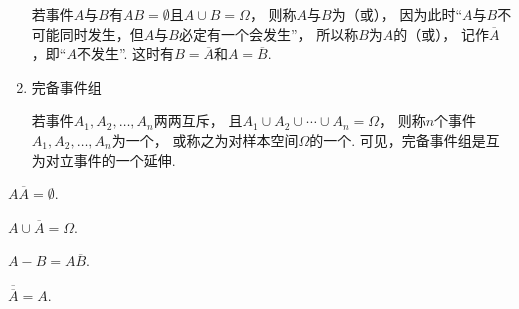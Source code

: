 \begin{definition}
\begin{enumerate}
	若事件\(A\)与\(B\)有\(AB = \emptyset\)且\(A \cup B = \Omega\)，
	则称\(A\)与\(B\)为（或），
	因为此时“\(A\)与\(B\)不可能同时发生，但\(A\)与\(B\)必定有一个会发生”，
	所以称\(B\)为\(A\)的（或），
	记作\(\overline{A}\)，即“\(A\)不发生”.
	这时有\(B = \overline{A}\)和\(A = \overline{B}\).

	\item 完备事件组

	若事件\(A_1,A_2,\dotsc,A_n\)两两互斥，
	且\(A_1 \cup A_2 \cup \dotsb \cup A_n = \Omega\)，
	则称\(n\)个事件\(A_1,A_2,\dotsc,A_n\)为一个，
	或称之为对样本空间\(\Omega\)的一个.
	可见，完备事件组是互为对立事件的一个延伸.
\end{enumerate}
\end{definition}

\begin{property}
\(A \overline{A} = \emptyset\).
\end{property}

\begin{property}
\(A \cup \overline{A} = \Omega\).
\end{property}

\begin{property}
\(A - B = A \overline{B}\).
\end{property}

\begin{property}
\(\overline{\overline{A}} = A\).
\end{property}

